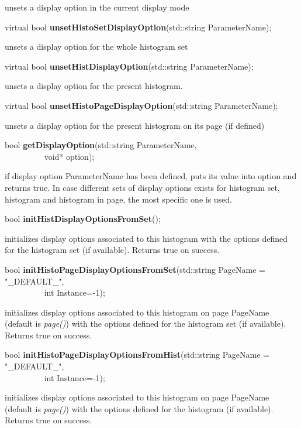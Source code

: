  unsets a display option in the current display mode


\item    virtual bool {\bf unsetHistoSetDisplayOption}(std::string ParameterName); 


 unsets a display option for the whole histogram set


\item    virtual bool {\bf unsetHistDisplayOption}(std::string ParameterName); 


 unsets a display option for the present histogram.


\item    virtual bool {\bf unsetHistoPageDisplayOption}(std::string ParameterName);


 unsets a display option for the present histogram on its page (if defined)


\item    bool {\bf getDisplayOption}(std::string ParameterName,\\\mbox{}~~~~~~~~~
			void* option);

 if display option  ParameterName has been defined, puts its value into
 option and returns true. In case different sets of display options
 exists for histogram set, histogram and histogram in page, the most
 specific one is used.


\item    bool {\bf initHistDisplayOptionsFromSet}(); 


 initializes display options associated to this histogram with the
 options defined for the histogram set (if available). Returns true on
 success.


\item    bool {\bf initHistoPageDisplayOptionsFromSet}(std::string PageName = "\_DEFAULT\_",\\\mbox{}~~~~~~~~~
					  int Instance=-1);

 initializes display options associated to this histogram on page
 PageName (default is {\it page()}) with the
 options defined for the histogram set (if available). Returns true on
 success.


\item    bool {\bf initHistoPageDisplayOptionsFromHist}(std::string PageName = "\_DEFAULT\_",\\\mbox{}~~~~~~~~~
					   int Instance=-1);

 initializes display options associated to this histogram on page
 PageName (default is {\it page()}) with the
 options defined for the histogram (if available). Returns true on
 success.


